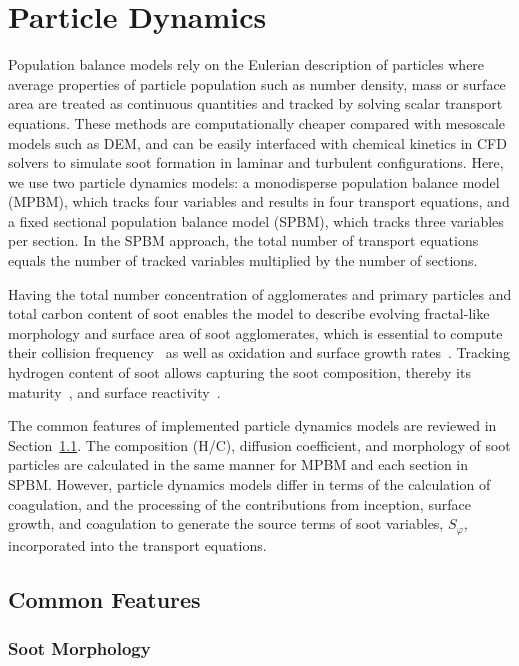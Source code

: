

\section{Particle Dynamics}
\label{sec:particledynamics}
Population balance models rely on the Eulerian description of particles where average properties of particle population such as number density, mass or surface area are treated as continuous quantities and tracked by solving scalar transport equations. These methods are computationally cheaper compared with mesoscale models such as DEM, and can be easily interfaced with chemical kinetics in CFD solvers to simulate soot formation in laminar and turbulent configurations. Here, we use two particle dynamics models: a monodisperse population balance model (MPBM), which tracks four variables and results in four transport equations, and a fixed sectional population balance model (SPBM), which tracks three variables per section. In the SPBM approach, the total number of transport equations equals the number of tracked variables multiplied by the number of sections. 

Having the total number concentration of agglomerates and primary particles and total carbon content of soot enables the model to describe evolving fractal-like morphology and surface area of soot agglomerates, which is essential to compute their collision frequency~\citep{mulholland1988cluster} as well as oxidation and surface growth rates~\citep{kelesidis2019estimating}. Tracking hydrogen content of soot allows capturing the soot composition, thereby its maturity~\citep{kholghy2016core}, and surface reactivity~\citep{blanquart2009analyzing}.

The common features of implemented particle dynamics models are reviewed in Section~\ref{sec:pdynamiccommon}. The composition (H/C), diffusion coefficient, and morphology of soot particles are calculated in the same manner for MPBM and each section in SPBM. However, particle dynamics models differ in terms of the calculation of coagulation, and the processing of the contributions from inception, surface growth, and coagulation to generate the source terms of soot variables, $S_{\varphi}$, incorporated into the transport equations.

\subsection{Common Features}
\label{sec:pdynamiccommon}
\subsubsection{Soot Morphology}
\label{sec:sootmorphology}

